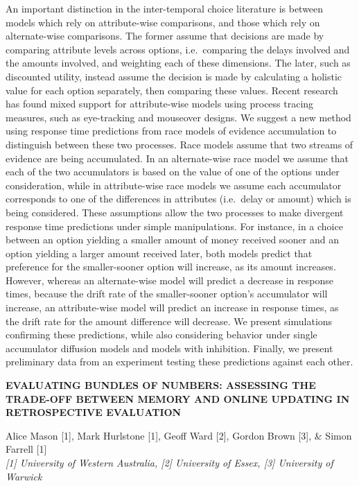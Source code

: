 \documentclass[]{article}
\begin{document}
An important distinction in the inter-temporal choice literature is
between models which rely on attribute-wise comparisons, and those which
rely on alternate-wise comparisons. The former assume that decisions are
made by comparing attribute levels across options, i.e.~comparing the
delays involved and the amounts involved, and weighting each of these
dimensions. The later, such as discounted utility, instead assume the
decision is made by calculating a holistic value for each option
separately, then comparing these values. Recent research has found mixed
support for attribute-wise models using process tracing measures, such
as eye-tracking and mouseover designs. We suggest a new method using
response time predictions from race models of evidence accumulation to
distinguish between these two processes. Race models assume that two
streams of evidence are being accumulated. In an alternate-wise race
model we assume that each of the two accumulators is based on the value
of one of the options under consideration, while in attribute-wise race
models we assume each accumulator corresponds to one of the differences
in attributes (i.e.~delay or amount) which is being considered. These
assumptions allow the two processes to make divergent response time
predictions under simple manipulations. For instance, in a choice
between an option yielding a smaller amount of money received sooner and
an option yielding a larger amount received later, both models predict
that preference for the smaller-sooner option will increase, as its
amount increases. However, whereas an alternate-wise model will predict
a decrease in response times, because the drift rate of the
smaller-sooner option's accumulator will increase, an attribute-wise
model will predict an increase in response times, as the drift rate for
the amount difference will decrease. We present simulations confirming
these predictions, while also considering behavior under single
accumulator diffusion models and models with inhibition. Finally, we
present preliminary data from an experiment testing these predictions
against each other.\\
\pagebreak  

\textbf{EVALUATING BUNDLES OF NUMBERS: ASSESSING THE TRADE-OFF BETWEEN
MEMORY AND ONLINE UPDATING IN RETROSPECTIVE EVALUATION}

Alice Mason {[}1{]}, Mark Hurlstone {[}1{]}, Geoff Ward {[}2{]}, Gordon
Brown {[}3{]}, \& Simon Farrell {[}1{]}\\
\emph{{[}1{]} University of Western Australia, {[}2{]} University of
Essex, {[}3{]} University of Warwick}
\end{document}
